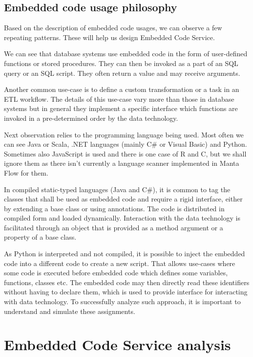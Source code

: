 \subsection{Embedded code usage philosophy}
Based on the description of embedded code usages, we can observe a few repeating patterns. These will help us design Embedded Code Service.
\par
We can see that database systems use embedded code in the form of user-defined functions or stored procedures. They can then be invoked as a part of an SQL query or an SQL script. They often return a value and may receive arguments.
\par
Another common use-case is to define a custom transformation or a task in an ETL workflow. The details of this use-case vary more than those in database systems but in general they implement a specific interface which functions are invoked in a pre-determined order by the data technology.
\par
Next observation relies to the programming language being used. Most often we can see Java or Scala, .NET languages (mainly C\# or Visual Basic) and Python. Sometimes also JavaScript is used and there is one case of R and C, but we shall ignore them as there isn't currently a language scanner implemented in Manta Flow for them.
\par
In compiled static-typed languages (Java and C\#), it is common to tag the classes that shall be used as embedded code and require a rigid interface, either by extending a base class or using annotations. The code is distributed in compiled form and loaded dynamically. Interaction with the data technology is facilitated through an object that is provided as a method argument or a property of a base class.
\par
As Python is interpreted and not compiled, it is possible to inject the embedded code into a different code to create a new script. That allows use-cases where some code is executed before embedded code which defines some variables, functions, classes etc. The embedded code may then directly read these identifiers without having to declare them, which is used to provide interface for interacting with data technology. To successfully analyze such approach, it is important to understand and simulate these assignments.

\section{Embedded Code Service analysis}

